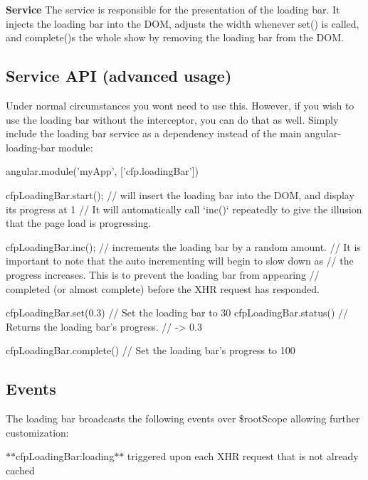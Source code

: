 {\bfseries Service} The service is responsible for the presentation of the loading bar. It injects the loading bar into the D\+OM, adjusts the width whenever {\ttfamily set()} is called, and {\ttfamily complete()}s the whole show by removing the loading bar from the D\+OM.

\subsection*{Service A\+PI (advanced usage)}

Under normal circumstances you won\textquotesingle{}t need to use this. However, if you wish to use the loading bar without the interceptor, you can do that as well. Simply include the loading bar service as a dependency instead of the main {\ttfamily angular-\/loading-\/bar} module\+:


\begin{DoxyCode}
angular.module('myApp', ['cfp.loadingBar'])
\end{DoxyCode}



\begin{DoxyCode}
cfpLoadingBar.start();
// will insert the loading bar into the DOM, and display its progress at 1%
// It will automatically call `inc()` repeatedly to give the illusion that the page load is progressing.

cfpLoadingBar.inc();
// increments the loading bar by a random amount.
// It is important to note that the auto incrementing will begin to slow down as
// the progress increases.  This is to prevent the loading bar from appearing
// completed (or almost complete) before the XHR request has responded. 

cfpLoadingBar.set(0.3) // Set the loading bar to 30%
cfpLoadingBar.status() // Returns the loading bar's progress.
// -> 0.3

cfpLoadingBar.complete()
// Set the loading bar's progress to 100%
\end{DoxyCode}


\subsection*{Events}

The loading bar broadcasts the following events over \$root\+Scope allowing further customization\+:

$\ast$$\ast${\ttfamily cfp\+Loading\+Bar\+:loading}$\ast$$\ast$ triggered upon each X\+HR request that is not already cached

